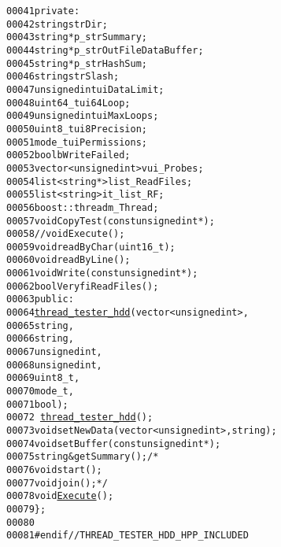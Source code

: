 \begin{footnotesize}
\begin{alltt}
00041     \textcolor{keyword}{private}:
00042         \textcolor{keywordtype}{string} strDir; 
00043         \textcolor{keywordtype}{string} *p\_strSummary; 
00044         \textcolor{keywordtype}{string} *p\_strOutFileDataBuffer; 
00045         \textcolor{keywordtype}{string} *p\_strHashSum; 
00046         \textcolor{keywordtype}{string} strSlash; 
00047         \textcolor{keywordtype}{unsigned} \textcolor{keywordtype}{int} uiDataLimit; 
00048         uint64\_t ui64Loop;
00049         \textcolor{keywordtype}{unsigned} \textcolor{keywordtype}{int} uiMaxLoops; 
00050         uint8\_t ui8Precision;
00051         mode\_t uiPermissions; 
00052         \textcolor{keywordtype}{bool} bWriteFailed;
00053         vector<unsigned int> vui\_Probes; 
00054         list<string*> list\_ReadFiles; 
00055         list<string> it\_list\_RF; 
00056         boost::thread m\_Thread; 
00057         \textcolor{keywordtype}{void} CopyTest(\textcolor{keyword}{const} \textcolor{keywordtype}{unsigned} \textcolor{keywordtype}{int} *);
00058         \textcolor{comment}{//void Execute();}
00059         \textcolor{keywordtype}{void} readByChar(uint16\_t);
00060         \textcolor{keywordtype}{void} readByLine();
00061         \textcolor{keywordtype}{void} Write(\textcolor{keyword}{const} \textcolor{keywordtype}{unsigned} \textcolor{keywordtype}{int}*);
00062         \textcolor{keywordtype}{bool} VeryfiReadFiles();
00063     \textcolor{keyword}{public}:
00064         \hyperlink{classthread__tester__hdd_ab318188f613c5b36e107084a8229f823}{thread_tester_hdd}(vector<unsigned int>,
00065                           \textcolor{keywordtype}{string},
00066                           \textcolor{keywordtype}{string},
00067                           \textcolor{keywordtype}{unsigned} \textcolor{keywordtype}{int},
00068                           \textcolor{keywordtype}{unsigned} \textcolor{keywordtype}{int},
00069                           uint8\_t,
00070                           mode\_t,
00071                           \textcolor{keywordtype}{bool});
00072         ~\hyperlink{classthread__tester__hdd}{thread_tester_hdd}();
00073         \textcolor{keywordtype}{void} setNewData(vector<unsigned int>,\textcolor{keywordtype}{string});
00074         \textcolor{keywordtype}{void} setBuffer(\textcolor{keyword}{const} \textcolor{keywordtype}{unsigned} \textcolor{keywordtype}{int}*);
00075         \textcolor{keywordtype}{string} &getSummary();\textcolor{comment}{/*}
00076 \textcolor{comment}{        void start();}
00077 \textcolor{comment}{        void join();*/}
00078         \textcolor{keywordtype}{void} \hyperlink{classthread__tester__hdd_a9d9f6f67783301bb7d1b9859ecd932c0}{Execute}();
00079 \};
00080 
00081 \textcolor{preprocessor}{#endif // THREAD\_TESTER\_HDD\_HPP\_INCLUDED}
\end{alltt}\end{footnotesize}

